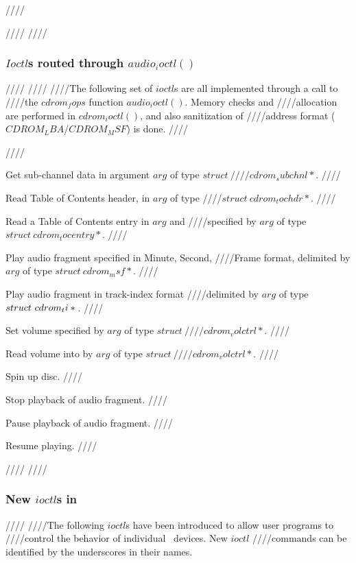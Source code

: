 ////\documentclass{article}
\begin{document}
////
////\subsubsection{$Ioctl$s routed through $audio_ioctl()$}
////\label{ioctl-audio}
////
////The following set of $ioctl$s are all implemented through a call to
////the $cdrom_fops$ function $audio_ioctl()$. Memory checks and
////allocation are performed in $cdrom_ioctl()$, and also sanitization of
////address format ($CDROM_LBA$/$CDROM_MSF$) is done.
////\begin{description}
////\item[CDROMSUBCHNL] Get sub-channel data in argument $arg$ of type $struct\
////cdrom_subchnl *{}$.
////\item[CDROMREADTOCHDR] Read Table of Contents header, in $arg$ of type
////$struct\ cdrom_tochdr *{}$. 
////\item[CDROMREADTOCENTRY] Read a Table of Contents entry in $arg$ and
////specified by $arg$ of type $struct\ cdrom_tocentry *{}$.
////\item[CDROMPLAYMSF] Play audio fragment specified in Minute, Second,
////Frame format, delimited by $arg$ of type $struct\ cdrom_msf *{}$.
////\item[CDROMPLAYTRKIND] Play audio fragment in track-index format
////delimited by $arg$ of type $struct\ \penalty-1000 cdrom_ti *{}$.
////\item[CDROMVOLCTRL] Set volume specified by $arg$ of type $struct\
////cdrom_volctrl *{}$.
////\item[CDROMVOLREAD] Read volume into by $arg$ of type $struct\
////cdrom_volctrl *{}$.
////\item[CDROMSTART] Spin up disc.
////\item[CDROMSTOP] Stop playback of audio fragment.
////\item[CDROMPAUSE] Pause playback of audio fragment.
////\item[CDROMRESUME] Resume playing.
////\end{description}
////
////\subsubsection{New $ioctl$s in \cdromc}
////
////The following $ioctl$s have been introduced to allow user programs to
////control the behavior of individual \cdrom\ devices. New $ioctl$
////commands can be identified by the underscores in their names.
\end{document}
